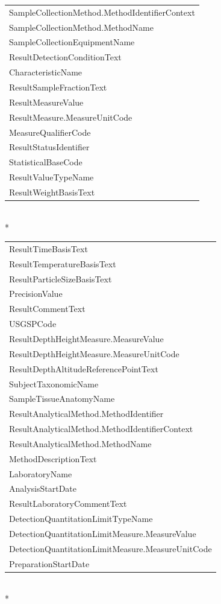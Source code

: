 \documentclass[a4paper,11pt]{article}
\begin{document}
\begin{tabular}{l}
  SampleCollectionMethod.MethodIdentifierContext \\ 
  SampleCollectionMethod.MethodName \\ 
  SampleCollectionEquipmentName \\ 
  ResultDetectionConditionText \\ 
  CharacteristicName \\ 
  ResultSampleFractionText \\ 
  ResultMeasureValue \\ 
  ResultMeasure.MeasureUnitCode \\ 
  MeasureQualifierCode \\ 
  ResultStatusIdentifier \\ 
  StatisticalBaseCode \\ 
  ResultValueTypeName \\ 
  ResultWeightBasisText \\ 
   \hline
\end{tabular}\\*
\newpage
\begin{tabular}{l}
  \hline
  \hline
ResultTimeBasisText \\ 
  ResultTemperatureBasisText \\ 
  ResultParticleSizeBasisText \\ 
  PrecisionValue \\ 
  ResultCommentText \\ 
  USGSPCode \\ 
  ResultDepthHeightMeasure.MeasureValue \\ 
  ResultDepthHeightMeasure.MeasureUnitCode \\ 
  ResultDepthAltitudeReferencePointText \\ 
  SubjectTaxonomicName \\ 
  SampleTissueAnatomyName \\ 
  ResultAnalyticalMethod.MethodIdentifier \\ 
  ResultAnalyticalMethod.MethodIdentifierContext \\ 
  ResultAnalyticalMethod.MethodName \\ 
  MethodDescriptionText \\ 
  LaboratoryName \\ 
  AnalysisStartDate \\ 
  ResultLaboratoryCommentText \\ 
  DetectionQuantitationLimitTypeName \\ 
  DetectionQuantitationLimitMeasure.MeasureValue \\ 
  DetectionQuantitationLimitMeasure.MeasureUnitCode \\ 
  PreparationStartDate \\ 
   \hline
\end{tabular}\\*
\end{document}
